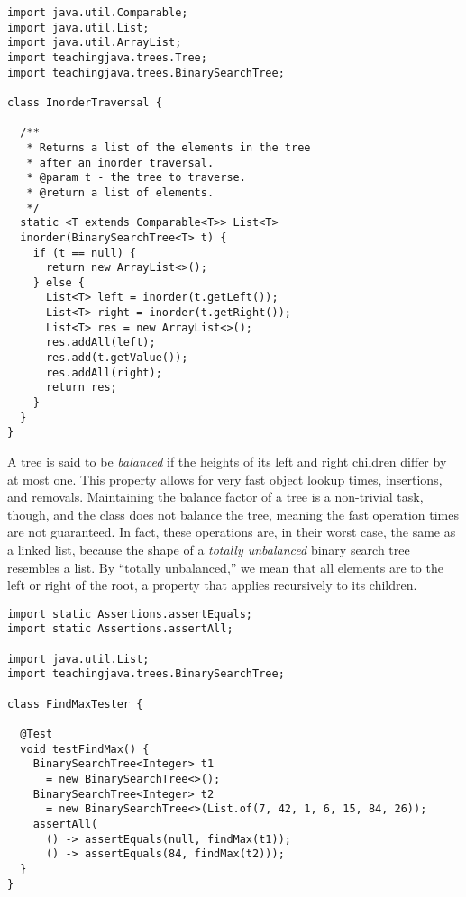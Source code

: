 \begin{lstlisting}[language=MyJava]
import java.util.Comparable;
import java.util.List;
import java.util.ArrayList;
import teachingjava.trees.Tree;
import teachingjava.trees.BinarySearchTree;

class InorderTraversal {

  /**
   * Returns a list of the elements in the tree 
   * after an inorder traversal.
   * @param t - the tree to traverse.
   * @return a list of elements.
   */
  static <T extends Comparable<T>> List<T> 
  inorder(BinarySearchTree<T> t) {
    if (t == null) {
      return new ArrayList<>();
    } else {
      List<T> left = inorder(t.getLeft());
      List<T> right = inorder(t.getRight());
      List<T> res = new ArrayList<>();
      res.addAll(left);
      res.add(t.getValue());
      res.addAll(right);
      return res;
    }
  }
}
\end{lstlisting}

A tree is said to be \emph{balanced} if the heights of its left and right children differ by at most one.
This property allows for very fast object lookup times, insertions, and removals. 
Maintaining the balance factor of a tree is a non-trivial task, though, and the  class does not balance the tree, meaning the fast operation times are not guaranteed.
In fact, these operations are, in their worst case, the same as a linked list, because the shape of a \emph{totally unbalanced} binary search tree resembles a list. 
By ``totally unbalanced,'' we mean that all elements are to the left or right of the root, a property that applies recursively to its children.


\begin{lstlisting}[language=MyJava]
import static Assertions.assertEquals;
import static Assertions.assertAll;

import java.util.List;
import teachingjava.trees.BinarySearchTree;

class FindMaxTester {

  @Test
  void testFindMax() {
    BinarySearchTree<Integer> t1 
      = new BinarySearchTree<>();
    BinarySearchTree<Integer> t2 
      = new BinarySearchTree<>(List.of(7, 42, 1, 6, 15, 84, 26));
    assertAll(
      () -> assertEquals(null, findMax(t1));
      () -> assertEquals(84, findMax(t2)));
  }
}
\end{lstlisting}

